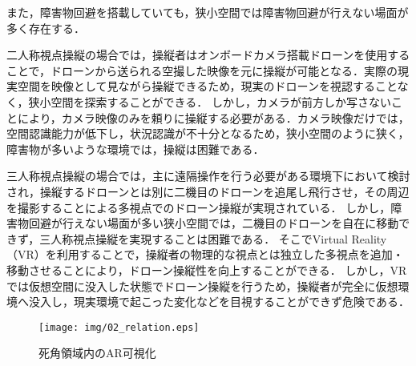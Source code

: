 \documentclass[submit, sigrecommended]{ipsj}
\begin{document}
また，障害物回避を搭載していても，狭小空間では障害物回避が行えない場面が多く存在する\cite{article-drone12}．
\par
二人称視点操縦の場合では，操縦者はオンボードカメラ搭載ドローンを使用することで，ドローンから送られる空撮した映像を元に操縦が可能となる\cite{article-drone08}．実際の現実空間を映像として見ながら操縦できるため，現実のドローンを視認することなく，狭小空間を探索することができる\cite{book-drone02}．
しかし，カメラが前方しか写さないことにより\cite{article-drone09}，カメラ映像のみを頼りに操縦する必要がある．カメラ映像だけでは，空間認識能力が低下し\cite{article-drone10}，状況認識が不十分となるため\cite{article-drone11}\cite{book-drone03}，狭小空間のように狭く，障害物が多いような環境では，操縦は困難である．
\par
三人称視点操縦の場合では，主に遠隔操作を行う必要がある環境下において検討され，操縦するドローンとは別に二機目のドローンを追尾し飛行させ，その周辺を撮影することによる多視点でのドローン操縦が実現されている\cite{book-drone05}．
しかし，障害物回避が行えない場面が多い狭小空間では，二機目のドローンを自在に移動できず，三人称視点操縦を実現することは困難である．
そこでVirtual Reality（VR）を利用することで，操縦者の物理的な視点とは独立した多視点を追加・移動させることにより，ドローン操縦性を向上することができる\cite{book-drone04}．
しかし，VRでは仮想空間に没入した状態でドローン操縦を行うため\cite{article-drone13}，操縦者が完全に仮想環境へ没入し，現実環境で起こった変化などを目視することができず危険である．


\begin{figure}[tb]
  \centering
  \texttt{[image: img/02\_relation.eps]}
  \caption{死角領域内のAR可視化}
  \label{fig:02_relation}
  \end{figure}
  
\end{document}
